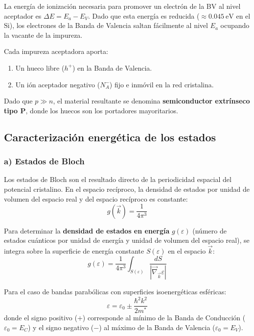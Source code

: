 \begin{concepto}
La energía de ionización necesaria para promover un electrón de la BV al nivel aceptador es $\Delta E = E_a - E_V$. Dado que esta energía es reducida ($\approx \SI{0.045}{\eV}$ en el $\text{Si}$), los electrones de la Banda de Valencia saltan fácilmente al nivel $E_a$ ocupando la vacante de la impureza.

Cada impureza aceptadora aporta:
\begin{enumerate}
    \item Un hueco libre ($h^+$) en la Banda de Valencia.
    \item Un ión aceptador negativo ($N_A^-$) fijo e inmóvil en la red cristalina.
\end{enumerate}
Dado que $p \gg n$, el material resultante se denomina \textbf{semiconductor extrínseco tipo P}, donde los huecos son los portadores mayoritarios.
\end{concepto}

\newpage

\subsection{Caracterización energética de los estados}

\subsubsection{a) Estados de Bloch}

Los estados de Bloch son el resultado directo de la periodicidad espacial del potencial cristalino. En el espacio recíproco, la densidad de estados por unidad de volumen del espacio real y del espacio recíproco es constante:
\[
g(\vec{k}) = \frac{1}{4\pi^3}
\]

Para determinar la \textbf{densidad de estados en energía} $g(\varepsilon)$ (número de estados cuánticos por unidad de energía y unidad de volumen del espacio real), se integra sobre la superficie de energía constante $S(\varepsilon)$ en el espacio $\vec{k}$:
\[
g(\varepsilon) = \frac{1}{4\pi^3} \int_{S(\varepsilon)} \frac{dS}{|\vec{\nabla}_{\vec{k}} \varepsilon|}
\]

Para el caso de bandas parabólicas con superficies isoenergéticas esféricas:
\[
\varepsilon = \varepsilon_0 \pm \frac{\hbar^2 k^2}{2m^*}
\]
donde el signo positivo ($+$) corresponde al mínimo de la Banda de Conducción ($\varepsilon_0 = E_C$) y el signo negativo ($-$) al máximo de la Banda de Valencia ($\varepsilon_0 = E_V$).

